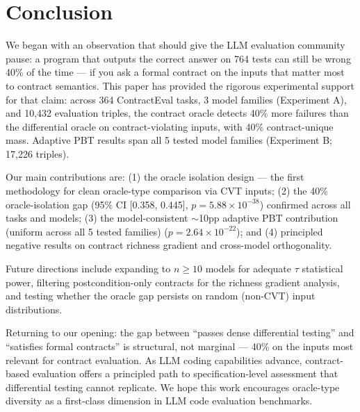 \section{Conclusion}
\label{sec:conclusion}

We began with an observation that should give the LLM evaluation community pause: a program that outputs the correct answer on 764 tests can still be wrong 40\% of the time --- if you ask a formal contract on the inputs that matter most to contract semantics. This paper has provided the rigorous experimental support for that claim: across 364 ContractEval tasks, 3 model families (Experiment A), and 10,432 evaluation triples, the contract oracle detects 40\% more failures than the differential oracle on contract-violating inputs, with 40\% contract-unique mass. Adaptive PBT results span all 5 tested model families (Experiment B; 17,226 triples).

Our main contributions are: (1) the oracle isolation design --- the first methodology for clean oracle-type comparison via CVT inputs; (2) the 40\% oracle-isolation gap (95\% CI [0.358, 0.445], $p = 5.88 \times 10^{-38}$) confirmed across all tasks and models; (3) the model-consistent $\sim$10pp adaptive PBT contribution (uniform across all 5 tested families) ($p = 2.64 \times 10^{-22}$); and (4) principled negative results on contract richness gradient and cross-model orthogonality.

Future directions include expanding to $n \geq 10$ models for adequate $\tau$ statistical power, filtering postcondition-only contracts for the richness gradient analysis, and testing whether the oracle gap persists on random (non-CVT) input distributions.

Returning to our opening: the gap between ``passes dense differential testing'' and ``satisfies formal contracts'' is structural, not marginal --- 40\% on the inputs most relevant for contract evaluation. As LLM coding capabilities advance, contract-based evaluation offers a principled path to specification-level assessment that differential testing cannot replicate. We hope this work encourages oracle-type diversity as a first-class dimension in LLM code evaluation benchmarks.

